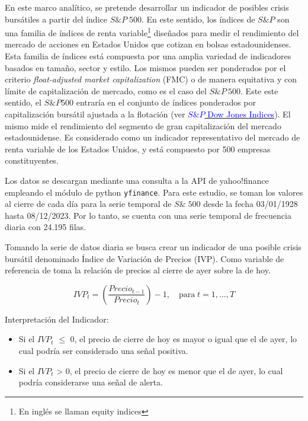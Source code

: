 \documentclass[
  12pt]{article}
\begin{document}
En este marco analítico, se pretende desarrollar un indicador de
posibles crisis bursátiles a partir del índice \(S\&P\;500\). En este
sentido, los índices de \(S\&P\) son una familia de índices de renta
variable\footnote{En inglés se llaman equity indices} diseñados para
medir el rendimiento del mercado de acciones en Estados Unidos que
cotizan en bolsas estadounidenses. Esta familia de índices está
compuesta por una amplia variedad de indicadores basados en tamaño,
sector y estilo. Los mismos pueden ser ponderados por el criterio
\textit{float-adjusted market capitalization} (FMC) o de manera
equitativa y con límite de capitalización de mercado, como es el caso
del \(S\&P\:500\). Este este sentido, el \(S\&P 500\) entraría en el
conjunto de índices ponderados por capitalización bursátil ajustada a la
flotación (ver
\href{https://www.spglobal.com/spdji/en/methodology/article/sp-us-indices-methodology/}{\textcolor{blue}{$S\&P$ Dow Jones Indices}}).
El mismo mide el rendimiento del segmento de gran capitalización del
mercado estadounidense. Es considerado como un indicador representativo
del mercado de renta variable de los Estados Unidos, y está compuesto
por 500 empresas constituyentes.

Los datos se descargan mediante una consulta a la API de yahoo!finance
empleando el módulo de python \texttt{yfinance}. Para este estudio, se
toman los valores al cierre de cada día para la serie temporal de
\(S\&\;500\) desde la fecha 03/01/1928 hasta 08/12/2023. Por lo tanto,
se cuenta con una serie temporal de frecuencia diaria con 24.195 filas.

Tomando la serie de datos diaria se busca crear un indicador de una
posible crisis bursátil denominado Índice de Variación de Precios (IVP).
Como variable de referencia de toma la relación de precios al cierre de
ayer sobre la de hoy.

\begin{equation}
IVP_t=\left (\frac{Precio_{t-1}}{Precio_t}\right ) -1,\quad\text{para}\; t=1,...,T 
\end{equation} \vspace{0.5cm}

Interpretación del Indicador:

\begin{itemize}
\item Si el $IVP_t$    $\leq$ 0, el precio de cierre de hoy es mayor o igual que el de ayer, lo cual podría ser considerado una señal positiva.
\item Si el $IVP_t$ > 0, el precio de cierre de hoy es menor que el de ayer, lo cual podría considerarse una señal de alerta.
\end{itemize}
\end{document}
